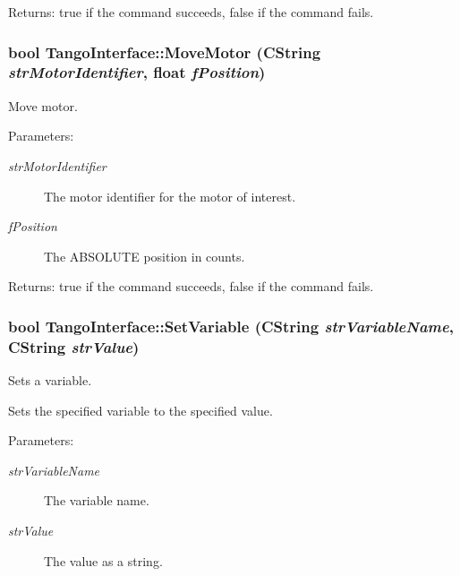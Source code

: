\begin{Desc}
\item[Returns:]true if the command succeeds, false if the command fails. \end{Desc}
\hypertarget{classTangoInterface_9db5a121d918ac94527d5e3fc635d002}{
\subsubsection[MoveMotor]{\setlength{\rightskip}{0pt plus 5cm}bool TangoInterface::MoveMotor (CString {\em strMotorIdentifier}, \/  float {\em fPosition})}}
\label{classTangoInterface_9db5a121d918ac94527d5e3fc635d002}


Move motor. 

\begin{Desc}
\item[Parameters:]
\begin{description}
\item[{\em strMotorIdentifier}]The motor identifier for the motor of interest.\item[{\em fPosition}]The ABSOLUTE position in counts. \end{description}
\end{Desc}


\begin{Desc}
\item[Returns:]true if the command succeeds, false if the command fails. \end{Desc}
\hypertarget{classTangoInterface_c37a6c8ebf341566b1cba2ce56630811}{
\subsubsection[SetVariable]{\setlength{\rightskip}{0pt plus 5cm}bool TangoInterface::SetVariable (CString {\em strVariableName}, \/  CString {\em strValue})}}
\label{classTangoInterface_c37a6c8ebf341566b1cba2ce56630811}


Sets a variable. 

Sets the specified variable to the specified value.

\begin{Desc}
\item[Parameters:]
\begin{description}
\item[{\em strVariableName}]The variable name. \item[{\em strValue}]The value as a string. \end{description}
\end{Desc}


